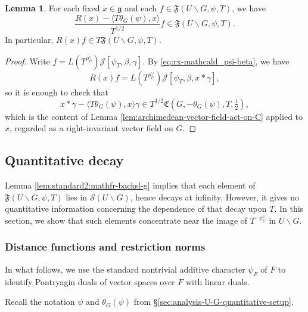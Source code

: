 \documentclass[reqno]{amsart}
\theoremstyle{plain} \newtheorem{theorem} {Theorem}
\theoremstyle{definition} \newtheorem{definition} [theorem] {Definition}
\theoremstyle{itplain} %
\newtheorem{lemma}[theorem]{Lemma}
\numberwithin{equation}{section}
\numberwithin{theorem}{section}
\begin{document}
\begin{lemma}\label{lem:standard:each-fixed-x-1}
  For each fixed $x \in \mathfrak{g}$ and each $f \in \mathfrak{F}(U \backslash G, \psi, T)$, we have
  \begin{equation*}
    \frac{R(x) - \langle T \theta_G(\psi)  , x  \rangle }{T^{1/2}} f \in \mathfrak{F}(U \backslash G, \psi, T).
  \end{equation*}
  In particular, $R(x) f \in T \mathfrak{F}(U \backslash G, \psi, T)$.
\end{lemma}
\begin{proof}
  Write $f = L(T^{\rho_U^\vee}) \mathcal{J}[\psi_T,\beta,\gamma]$.  By \eqref{eq:rx-mathcald_psi-beta}, we have
  \begin{equation*}
    R(x) f = L(T^{\rho_U^\vee}) \mathcal{J}[\psi_T,\beta,x \ast \gamma],
  \end{equation*}
  so it is enough to check that
  \begin{equation*}
    x \ast \gamma -  \langle T \theta_G(\psi), x \rangle \gamma
    \in T^{1/2} \mathfrak{C}(G,-\theta_G(\psi),T,\tfrac{1}{2}),
  \end{equation*}
  which is the content of Lemma \ref{lem:archimedean-vector-field-act-on-C} applied to $x$, regarded as a right-invariant vector field on $G$.
\end{proof}

\subsection{Quantitative decay}
Lemma \ref{lem:standard2:mathfr-backsl-g} implies that each element of $\mathfrak{F}(U \backslash G, \psi, T)$ lies in $\mathcal{S}(U \backslash G)$, hence decays at infinity.  However, it gives no quantitative information concerning the dependence of that decay upon $T$.  In this section, we show that such elements concentrate near the image of $T^{-\rho_U^\vee}$ in $U \backslash G$.   


\subsubsection{Distance functions and restriction norms}\label{sec:dist-funct-restr}
In what follows, we use the standard nontrivial additive character $\psi_F$ of $F$ to identify Pontryagin duals of vector spaces over $F$ with linear duals.

Recall the notation $\psi$ and $\theta_G(\psi)$ from \S\ref{sec:analysis-U-G-quantitative-setup}.
\end{document}
